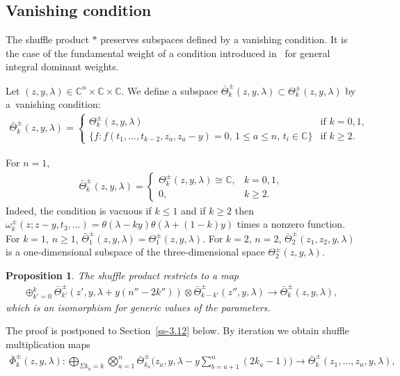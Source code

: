 \documentclass[10pt,a4paper]{amsart}
\numberwithin{equation}{section}
\newtheorem{Proposition}[Theorem]{Proposition}
 { \theoremstyle{definition}
\newtheorem{Definition}[Theorem]{Definition}
\newtheorem{Example}[Theorem]{Example}
\newtheorem{Remark}[Theorem]{Remark} }
\begin{document}
\subsection{Vanishing condition}\label{ss-3.3}
The shuffle product $*$ preserves subspaces defined by a vanishing condition. It is the case of the fundamental weight of a condition introduced in~\cite[Section~8]{FelderTarasovVarchenko1997} for general integral dominant weights.

Let $(z,y,\lambda)\in\mathbb C^n\times \mathbb C\times \mathbb C$. We define a subspace $\bar\Theta^\pm_k(z,y,\lambda)\subset\Theta^\pm_k(z,y,\lambda)$ by a~vanishing condition:
\begin{gather*}
 \bar\Theta^\pm_k(z,y,\lambda) = \begin{cases} \Theta^\pm_k(z,y,\lambda)&\text{if $k=0,1$,}\\
\{f \colon f(t_1,\dots,t_{k-2},z_a,z_a-y)=0,\,1\leq a\leq n,\, t_i\in\mathbb C\} &\text{if $k\geq2$.}
\end{cases}
\end{gather*}
\begin{Example}\label{example-5} For $n=1$,
 \begin{gather*}
 \bar\Theta^\pm_k(z,y,\lambda) =\begin{cases}
 \Theta^\pm_k(z,y,\lambda)\cong \mathbb C,&\text{$k=0,1$,}\\
 0,&\text{$k\geq2$.}
 \end{cases}
 \end{gather*}
 Indeed, the condition is vacuous if $k\leq 1$ and if $k\geq2$ then $\omega^\pm_k(z;z-y,t_3,\dots)=\theta(\lambda-ky)\theta(\lambda+(1-k)y)$ times a nonzero function. For $k=1$, $n\geq1$, $\bar\Theta^\pm_1(z,y,\lambda) = \Theta^\pm_1(z,y,\lambda)$. For $k=2$, $n=2$, $\bar\Theta^\pm_2(z_1,z_2,y,\lambda)$ is a one-dimensional subspace of the three-dimensional space $\Theta^\pm_2(z,y,\lambda)$.
\end{Example}
\begin{Proposition}\label{prop-2} The shuffle product restricts to a map
\begin{gather*}
 \oplus_{k'=0}^k \bar\Theta^\pm_{k'} (z',y,\lambda+y(n''-2k'')) \otimes \bar\Theta^\pm_{k-k'} (z'',y,\lambda) \to \bar\Theta^\pm_k(z,y,\lambda),
 \end{gather*}
 which is an isomorphism for generic values of the parameters.
\end{Proposition}
The proof is postponed to Section~\ref{ss-3.12} below. By iteration we obtain shuffle multiplication maps
\begin{gather*}
 \bar\Phi_k^{\pm}(z,y,\lambda)\colon\bigoplus_{\Sigma k_a=k} \bigotimes_{a=1}^n \bar\Theta^\pm_{k_a}\bigg(z_a,y,\lambda-y\sum_{b=a+1}^n(2k_a-1)\bigg) \to \bar\Theta^\pm_k(z_1,\dots,z_n,y,\lambda),
\end{gather*}
\end{document}
